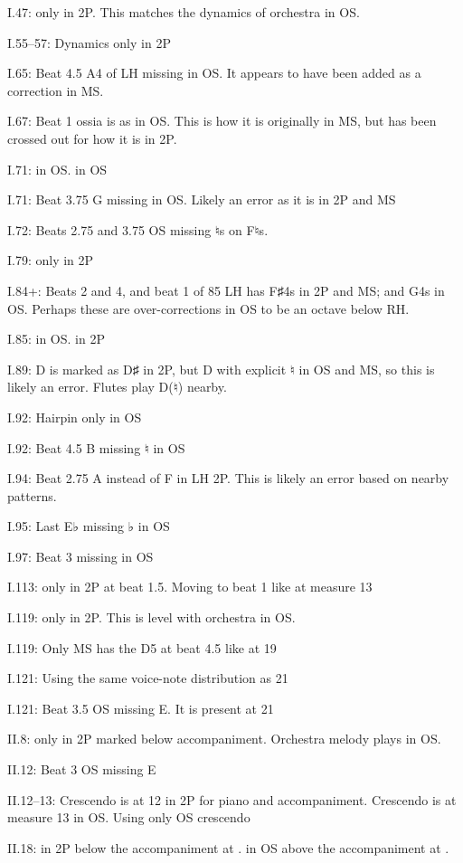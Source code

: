 \documentclass[twoside]{article}
\newcommand\dynmark[1]{\scalebox{0.9}{#1}{\kern1pt}}
\begin{document}
\begin{hangparas}{15pt}{1}
\begin{multicols}{2}
I.47: \dynmark{\p} only in 2P. This matches the dynamics of orchestra in OS.

I.55--57: Dynamics only in 2P

I.65: Beat 4.5 A4 of LH missing in OS. It appears to have been added as a correction in MS.

I.67: Beat 1 ossia is as in OS. This is how it is originally in MS, but has been crossed out for how it is in 2P.

I.71: \dynmark{\p} in OS. \dynmark{\pp} in OS

I.71: Beat 3.75 G missing in OS. Likely an error as it is in 2P and MS

I.72: Beats 2.75 and 3.75 OS missing ♮s on F♮s.

I.79: \dynmark{\pp} only in 2P

I.84+: Beats 2 and 4, and beat 1 of 85 LH has F♯4s in 2P and MS; and G4s in OS. Perhaps these are over-corrections in OS to be an octave below RH.

I.85: \dynmark{\pp} in OS. \dynmark{\p} in 2P

I.89: D is marked as D♯ in 2P, but D with explicit ♮ in OS and MS, so this is likely an error. Flutes play D(♮) nearby.

I.92: Hairpin only in OS

I.92: Beat 4.5 B missing ♮ in OS

I.94: Beat 2.75 A instead of F in LH 2P. This is likely an error based on nearby patterns.

I.95: Last E♭ missing ♭ in OS

I.97: Beat 3 missing in OS

I.113: \dynmark{\f} only in 2P at beat 1.5. Moving to beat 1 like at measure 13

I.119: \dynmark{\ff} only in 2P. This is level with orchestra in OS.

I.119: Only MS has the D5 at beat 4.5 like at 19

I.121: Using the same voice-note distribution as 21

I.121: Beat 3.5 OS missing E. It is present at 21

II.8: \dynmark{\mf} only in 2P marked below \dynmark{\f} accompaniment. Orchestra melody plays \dynmark{\mezzopiano} in OS.

II.12: Beat 3 OS missing E

II.12--13: Crescendo is at 12 in 2P for piano and accompaniment. Crescendo is at measure 13 in OS. Using only OS crescendo

II.18: \dynmark{\f} in 2P below the accompaniment at \dynmark{\ff}. \dynmark{\ff} in OS above the accompaniment at \dynmark{\f}.


\end{multicols}
\end{hangparas}
\end{document}
